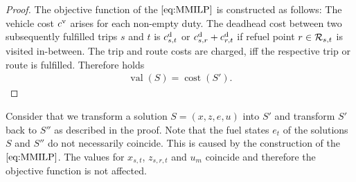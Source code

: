 \begin{proof}
The objective function of the $\eqref{eq:MMILP}$ is constructed as follows: The vehicle cost $c^{\operatorname{v}}$ arises for each non-empty duty. The deadhead cost between two subsequently fulfilled trips $s$ and $t$ is $c^{\operatorname{d}}_{s,t}$ or ${c^{\operatorname{d}}_{s,r}+c^{\operatorname{d}}_{r,t}}$ if refuel point ${r\in\mathcal{R}_{s,t}}$ is visited in-between. The trip and route costs are charged, iff the respective trip or route is fulfilled. Therefore holds
\begin{align*}
	\operatorname{val}(S) = \operatorname{cost}\left(S'\right).
\end{align*}

\end{proof}

\begin{remark}

Consider that we transform a solution ${S=(x,z,e,u)}$ into $S'$ and transform $S'$ back to $S''$ as described in the proof. Note that the fuel states $e_t$ of the solutions $S$ and $S''$ do not necessarily coincide. This is caused by the construction of the $\eqref{eq:MMILP}$. The values for $x_{s,t}$, $z_{s,r,t}$ and $u_m$ coincide and therefore the objective function is not affected.

\end{remark}